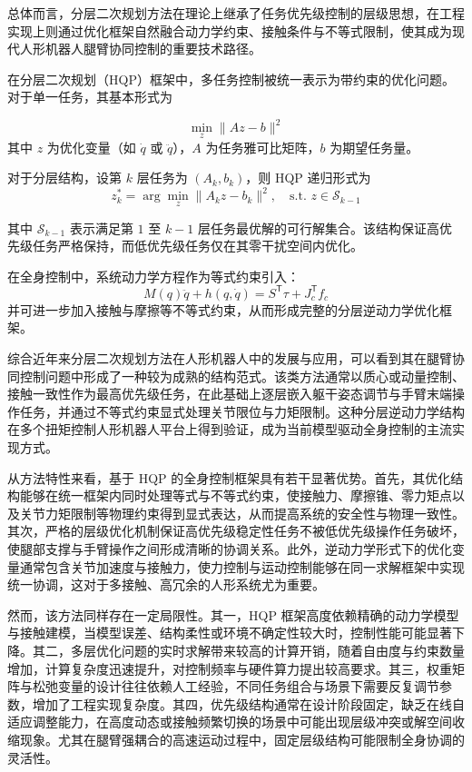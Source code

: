 总体而言，分层二次规划方法在理论上继承了任务优先级控制的层级思想，在工程实现上则通过优化框架自然融合动力学约束、接触条件与不等式限制，使其成为现代人形机器人腿臂协同控制的重要技术路径。

在分层二次规划（HQP）框架中，多任务控制被统一表示为带约束的优化问题。对于单一任务，其基本形式为

\begin{equation}
	\min_{z} \| A z - b \|^2
\end{equation}
其中 $z$ 为优化变量（如 $\dot{q}$ 或 $\ddot{q}$），$A$ 为任务雅可比矩阵，$b$ 为期望任务量。

对于分层结构，设第 $k$ 层任务为 $(A_k, b_k)$，则 HQP 递归形式为
\begin{equation}
	z_k^* =
	\arg\min_{z}
	\| A_k z - b_k \|^2,
	\quad
	\text{s.t. } z \in \mathcal{S}_{k-1}
\end{equation}

其中 $\mathcal{S}_{k-1}$ 表示满足第 $1$ 至 $k-1$ 层任务最优解的可行解集合。该结构保证高优先级任务严格保持，而低优先级任务仅在其零干扰空间内优化。

在全身控制中，系统动力学方程作为等式约束引入：
\begin{equation}
	M(q)\ddot{q} + h(q,\dot{q})
	= S^{\mathsf T}\tau + J_c^{\mathsf T} f_c
\end{equation}
并可进一步加入接触与摩擦等不等式约束，从而形成完整的分层逆动力学优化框架。


综合近年来分层二次规划方法在人形机器人中的发展与应用，可以看到其在腿臂协同控制问题中形成了一种较为成熟的结构范式。该类方法通常以质心或动量控制、接触一致性作为最高优先级任务，在此基础上逐层嵌入躯干姿态调节与手臂末端操作任务，并通过不等式约束显式处理关节限位与力矩限制。这种分层逆动力学结构在多个扭矩控制人形机器人平台上得到验证，成为当前模型驱动全身控制的主流实现方式。

从方法特性来看，基于 HQP 的全身控制框架具有若干显著优势。首先，其优化结构能够在统一框架内同时处理等式与不等式约束，使接触力、摩擦锥、零力矩点以及关节力矩限制等物理约束得到显式表达，从而提高系统的安全性与物理一致性。其次，严格的层级优化机制保证高优先级稳定性任务不被低优先级操作任务破坏，使腿部支撑与手臂操作之间形成清晰的协调关系。此外，逆动力学形式下的优化变量通常包含关节加速度与接触力，使力控制与运动控制能够在同一求解框架中实现统一协调，这对于多接触、高冗余的人形系统尤为重要。

然而，该方法同样存在一定局限性。其一，HQP 框架高度依赖精确的动力学模型与接触建模，当模型误差、结构柔性或环境不确定性较大时，控制性能可能显著下降。其二，多层优化问题的实时求解带来较高的计算开销，随着自由度与约束数量增加，计算复杂度迅速提升，对控制频率与硬件算力提出较高要求。其三，权重矩阵与松弛变量的设计往往依赖人工经验，不同任务组合与场景下需要反复调节参数，增加了工程实现复杂度。其四，优先级结构通常在设计阶段固定，缺乏在线自适应调整能力，在高度动态或接触频繁切换的场景中可能出现层级冲突或解空间收缩现象。尤其在腿臂强耦合的高速运动过程中，固定层级结构可能限制全身协调的灵活性。

